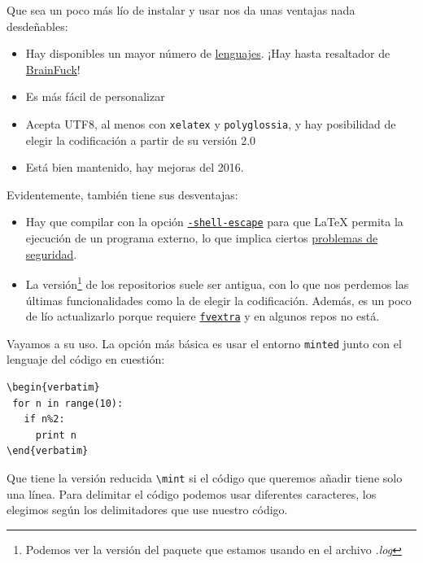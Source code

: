 Que sea un poco más lío de instalar y usar nos da unas ventajas nada
desdeñables:

\begin{itemize}
\item
  Hay disponibles un mayor número de
  \href{http://pygments.org/languages/}{lenguajes}. ¡Hay hasta
  resaltador de
  \href{https://es.wikipedia.org/wiki/Brainfuck}{BrainFuck}!
\item
  Es más fácil de personalizar
\item
  Acepta UTF8, al menos con \lstinline!xelatex! y
  \lstinline!polyglossia!, y hay posibilidad de elegir la codificación a
  partir de su versión 2.0
\item
  Está bien mantenido, hay mejoras del 2016.
\end{itemize}

Evidentemente, también tiene sus desventajas:

\begin{itemize}
\item
  Hay que compilar con la opción
  \href{https://tex.stackexchange.com/questions/20444/what-are-immediate-write18-and-how-does-one-use-them}{\lstinline!-shell-escape!}
  para que LaTeX permita la ejecución de un programa externo, lo que
  implica ciertos \href{https://0day.work/hacking-with-latex/}{problemas
  de seguridad}.
\item
  La versión\footnote{Podemos ver la versión del paquete que estamos
    usando en el archivo \emph{.log}} de los repositorios suele ser
  antigua, con lo que nos perdemos las últimas funcionalidades como la
  de elegir la codificación. Además, es un poco de lío actualizarlo
  porque requiere
  \href{https://www.ctan.org/pkg/fvextra}{\lstinline!fvextra!} y en
  algunos repos no está.
\end{itemize}

Vayamos a su uso. La opción más básica es usar el entorno
\lstinline!minted! junto con el lenguaje del código en cuestión:

\begin{lstlisting}[language={[latex]tex}]
\begin{verbatim}
 for n in range(10):
   if n%2:
     print n
\end{verbatim}
\end{lstlisting}

Que tiene la versión reducida \lstinline!\mint! si el código que
queremos añadir tiene solo una línea. Para delimitar el código podemos
usar diferentes caracteres, los elegimos según los delimitadores que use
nuestro código.

